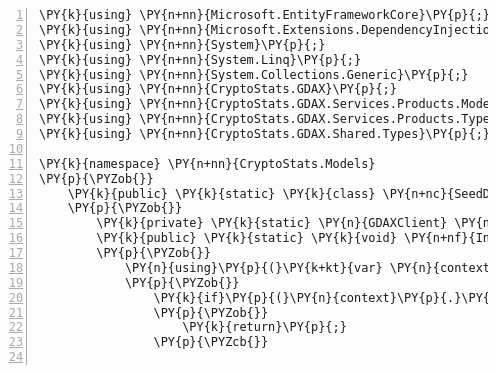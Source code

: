 \def\PYZbs{\char`\\}
\def\PYZus{\char`\_}
\def\PYZob{\char`\{}
\def\PYZcb{\char`\}}
\def\PYZca{\char`\^}
\def\PYZam{\char`\&}
\def\PYZlt{\char`\<}
\def\PYZgt{\char`\>}
\def\PYZsh{\char`\#}
\def\PYZpc{\char`\%}
\def\PYZdl{\char`\$}
\def\PYZhy{\char`\-}
\def\PYZsq{\char`\'}
\def\PYZdq{\char`\"}
\def\PYZti{\char`\~}
\def\PYZat{@}
\def\PYZlb{[}
\def\PYZrb{]}
\makeatother\begin{Verbatim}[commandchars=\\\{\},numbers=left,firstnumber=1,stepnumber=1,numberblanklines=0]
\PY{k}{using} \PY{n+nn}{Microsoft.EntityFrameworkCore}\PY{p}{;}
\PY{k}{using} \PY{n+nn}{Microsoft.Extensions.DependencyInjection}\PY{p}{;}
\PY{k}{using} \PY{n+nn}{System}\PY{p}{;}
\PY{k}{using} \PY{n+nn}{System.Linq}\PY{p}{;}
\PY{k}{using} \PY{n+nn}{System.Collections.Generic}\PY{p}{;}
\PY{k}{using} \PY{n+nn}{CryptoStats.GDAX}\PY{p}{;}
\PY{k}{using} \PY{n+nn}{CryptoStats.GDAX.Services.Products.Models}\PY{p}{;}
\PY{k}{using} \PY{n+nn}{CryptoStats.GDAX.Services.Products.Types}\PY{p}{;}
\PY{k}{using} \PY{n+nn}{CryptoStats.GDAX.Shared.Types}\PY{p}{;}

\PY{k}{namespace} \PY{n+nn}{CryptoStats.Models}
\PY{p}{\PYZob{}}
    \PY{k}{public} \PY{k}{static} \PY{k}{class} \PY{n+nc}{SeedData}
    \PY{p}{\PYZob{}}
        \PY{k}{private} \PY{k}{static} \PY{n}{GDAXClient} \PY{n}{client} \PY{p}{=} \PY{k}{new} \PY{n}{GDAXClient}\PY{p}{(}\PY{p}{)}\PY{p}{;}
        \PY{k}{public} \PY{k}{static} \PY{k}{void} \PY{n+nf}{Initialize}\PY{p}{(}\PY{n}{IServiceProvider} \PY{n}{serviceProvider}\PY{p}{)}
        \PY{p}{\PYZob{}}
            \PY{n}{using}\PY{p}{(}\PY{k+kt}{var} \PY{n}{context} \PY{p}{=} \PY{k}{new} \PY{n}{CryptoContext}\PY{p}{(}\PY{n}{serviceProvider}\PY{p}{.}\PY{n}{GetRequiredService}\PY{p}{\PYZlt{}}\PY{n}{DbContextOptions}\PY{p}{\PYZlt{}}\PY{n}{CryptoContext}\PY{p}{\PYZgt{}}\PY{p}{\PYZgt{}}\PY{p}{(}\PY{p}{)}\PY{p}{)}\PY{p}{)}
            \PY{p}{\PYZob{}}
                \PY{k}{if}\PY{p}{(}\PY{n}{context}\PY{p}{.}\PY{n}{Exchanges}\PY{p}{.}\PY{n}{Any}\PY{p}{(}\PY{p}{)} \PY{p}{\PYZam{}}\PY{p}{\PYZam{}} \PY{n}{context}\PY{p}{.}\PY{n}{Stats}\PY{p}{.}\PY{n}{Any}\PY{p}{(}\PY{p}{)}\PY{p}{)}
                \PY{p}{\PYZob{}}
                    \PY{k}{return}\PY{p}{;}
                \PY{p}{\PYZcb{}}
                

\end{Verbatim}
